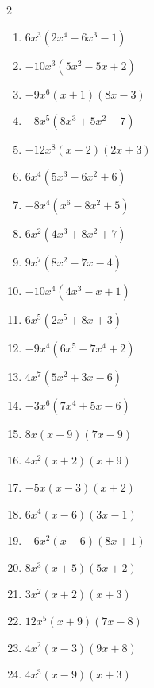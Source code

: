 \documentclass[11pt,oneside]{book}
\begin{document}
\begin{multicols}{2}
\begin{enumerate}[leftmargin=*,label=\textbf{A\arabic*.},itemsep=0.45\baselineskip]
\item $ 6 x^{3} \left(2 x^{4} - 6 x^{3} - 1\right) $
\item $ - 10 x^{3} \left(5 x^{2} - 5 x + 2\right) $
\item $ - 9 x^{6} \left(x + 1\right) \left(8 x - 3\right) $
\item $ - 8 x^{5} \left(8 x^{3} + 5 x^{2} - 7\right) $
\item $ - 12 x^{8} \left(x - 2\right) \left(2 x + 3\right) $
\item $ 6 x^{4} \left(5 x^{3} - 6 x^{2} + 6\right) $
\item $ - 8 x^{4} \left(x^{6} - 8 x^{2} + 5\right) $
\item $ 6 x^{2} \left(4 x^{3} + 8 x^{2} + 7\right) $
\item $ 9 x^{7} \left(8 x^{2} - 7 x - 4\right) $
\item $ - 10 x^{4} \left(4 x^{3} - x + 1\right) $
\item $ 6 x^{5} \left(2 x^{5} + 8 x + 3\right) $
\item $ - 9 x^{4} \left(6 x^{5} - 7 x^{4} + 2\right) $
\item $ 4 x^{7} \left(5 x^{2} + 3 x - 6\right) $
\item $ - 3 x^{6} \left(7 x^{4} + 5 x - 6\right) $
\item $ 8 x \left(x - 9\right) \left(7 x - 9\right) $
\item $ 4 x^{2} \left(x + 2\right) \left(x + 9\right) $
\item $ - 5 x \left(x - 3\right) \left(x + 2\right) $
\item $ 6 x^{4} \left(x - 6\right) \left(3 x - 1\right) $
\item $ - 6 x^{2} \left(x - 6\right) \left(8 x + 1\right) $
\item $ 8 x^{3} \left(x + 5\right) \left(5 x + 2\right) $
\item $ 3 x^{2} \left(x + 2\right) \left(x + 3\right) $
\item $ 12 x^{5} \left(x + 9\right) \left(7 x - 8\right) $
\item $ 4 x^{2} \left(x - 3\right) \left(9 x + 8\right) $
\item $ 4 x^{3} \left(x - 9\right) \left(x + 3\right) $
\end{enumerate}
\end{multicols}
\end{document}

